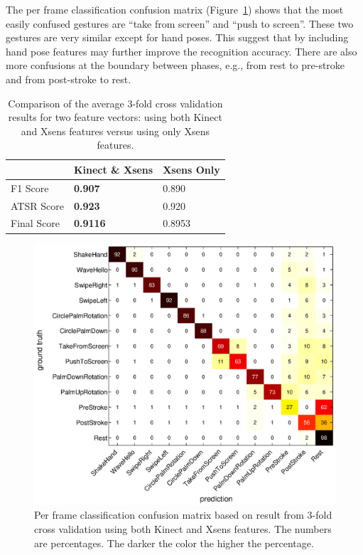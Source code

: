\documentclass{sig-alternate-2013}
\begin{document}
The per frame classification confusion matrix (Figure~\ref{fig:confusion}) shows that the most easily confused gestures are ``take from screen'' and ``push to screen''. These two gestures are very similar except for hand
poses. This suggest that by including hand pose features may further improve
the recognition accuracy. There are also more confusions at the boundary between phases, e.g., 
from rest to pre-stroke and from post-stroke to rest.

\begin{table}[tb]
\begin{center}
\begin{tabular}{|l|l|l|}
\hline
 & Kinect \& Xsens & Xsens Only \\
\hline
F1 Score & \textbf{0.907} & 0.890 \\
\hline
ATSR Score & \textbf{0.923} & 0.920 \\
\hline
Final Score & \textbf{0.9116} & 0.8953 \\
\hline
\end{tabular}
\caption{Comparison of the average 3-fold cross validation results for two feature vectors:
using both Kinect and Xsens features versus using only Xsens features. }
\label{tab:comp-feature}
\end{center}
\end{table}

\begin{figure}[tb]
\centering
\includegraphics[trim={6cm 3.5cm 10cm 1.5cm}, clip, width=1\columnwidth]{fig/confusion-matrix.eps}
\caption{Per frame classification confusion matrix based on result from 3-fold cross validation using both Kinect and Xsens
features. The numbers are percentages. The darker the color the higher the percentage.}
\label{fig:confusion}
\end{figure}
\end{document}

